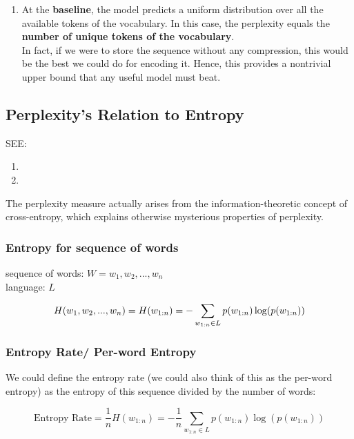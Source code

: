 \begin{enumerate}
\begin{enumerate}
        \item At the \textbf{baseline}, the model predicts a uniform distribution over all the available tokens of the vocabulary. In this case, the perplexity equals the \textbf{number of unique tokens of the vocabulary}.\\
        In fact, if we were to store the sequence without any compression, this would be the best we could do for encoding it. Hence, this provides a nontrivial upper bound that any useful model must beat.
    \end{enumerate}

\end{enumerate}




\subsection{Perplexity’s Relation to Entropy}

SEE:
\begin{enumerate}
    \item {}
    \item {}
\end{enumerate}

The perplexity measure actually arises from the information-theoretic concept of cross-entropy, which explains otherwise mysterious properties of perplexity.



\subsubsection{Entropy for sequence of words}\label{Entropy for sequence of words}
sequence of words: $W = {w_1,w_2,...,w_n}$\\
language: $L$

\[
    H(w_1,w_2,...,w_n) = H(w_{1:n}) = -\displaystyle\sum_{w_{1:n}\in L} p(w_{1:n})\log(p(w_{1:n}))
\]

\subsubsection{Entropy Rate/ Per-word Entropy}
We could define the entropy rate (we could also think of this as the per-word entropy) as the entropy of this sequence divided by the number of words:

\[
    \text{Entropy Rate} = \dfrac{1}{n}H(w_{1:n}) = -\dfrac{1}{n}\sum_{w_{1:n}\in L} p(w_{1:n})\log(p(w_{1:n}))
\]

